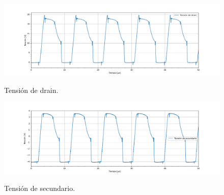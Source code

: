 \begin{figure}[H]
	\centering
	\includegraphics[width=0.9\linewidth]{ImagenesParteIV/Vds.png}
	\label{fig:vds_4}
	\caption{Tensión de drain.}
\end{figure}
\begin{figure}[H]
	\centering
	\includegraphics[width=0.9\linewidth]{ImagenesParteIV/Vsec.png}
	\label{fig:vsec_4}
	\caption{Tensión de secundario.}
\end{figure}

%